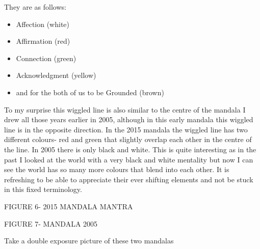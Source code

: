 They are as follows:
\begin{itemize}
\item Affection (white)
\end{itemize}

\begin{itemize}
\item Affirmation (red)
\end{itemize}

\begin{itemize}
\item Connection (green)
\end{itemize}

\begin{itemize}
\item Acknowledgment (yellow)
\end{itemize}

\begin{itemize}
\item and for the both of us to be Grounded (brown)
\end{itemize}

    
To my surprise this wiggled line is also similar to the centre of the mandala I drew all those years earlier in 2005, although in this early mandala this wiggled line is in the opposite direction. In the 2015 mandala the wiggled line has two different colours- red and green that slightly overlap each other in the centre of the line. In 2005 there is only black and white. This is quite interesting as in the past I looked at the world with a very black and white mentality but now I can see the world has so many more colours that blend into each other. It is refreshing to be able to appreciate their ever shifting elements and not be stuck in this fixed terminology. 


FIGURE 6- 2015 MANDALA MANTRA
             		

FIGURE 7- MANDALA 2005

Take a double exposure picture of these two mandalas

